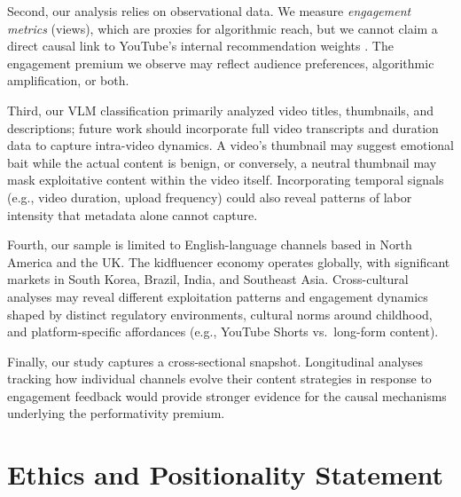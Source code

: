 \documentclass[]{ieeeaccess}
\begin{document}
Second, our analysis relies on observational data. We measure \emph{engagement metrics} (views), which are proxies for algorithmic reach, but we cannot claim a direct causal link to YouTube's internal recommendation weights \cite{rieder2018ranking}. The engagement premium we observe may reflect audience preferences, algorithmic amplification, or both.

Third, our VLM classification primarily analyzed video titles, thumbnails, and descriptions; future work should incorporate full video transcripts and duration data to capture intra-video dynamics. A video's thumbnail may suggest emotional bait while the actual content is benign, or conversely, a neutral thumbnail may mask exploitative content within the video itself. Incorporating temporal signals (e.g., video duration, upload frequency) could also reveal patterns of labor intensity that metadata alone cannot capture.

Fourth, our sample is limited to English-language channels based in North America and the UK. The kidfluencer economy operates globally, with significant markets in South Korea, Brazil, India, and Southeast Asia. Cross-cultural analyses may reveal different exploitation patterns and engagement dynamics shaped by distinct regulatory environments, cultural norms around childhood, and platform-specific affordances (e.g., YouTube Shorts vs.\ long-form content).

Finally, our study captures a cross-sectional snapshot. Longitudinal analyses tracking how individual channels evolve their content strategies in response to engagement feedback would provide stronger evidence for the causal mechanisms underlying the performativity premium.

\section{Ethics and Positionality Statement}
\end{document}

